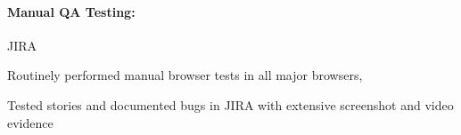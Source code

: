 \begin{position}
  \paragraph{Manual QA Testing:} JIRA
  \begin{myitem}
  \item Routinely performed manual browser tests in all major browsers,
  \item Tested stories and documented bugs in JIRA with extensive screenshot and video evidence
  \end{myitem}
\end{position}
